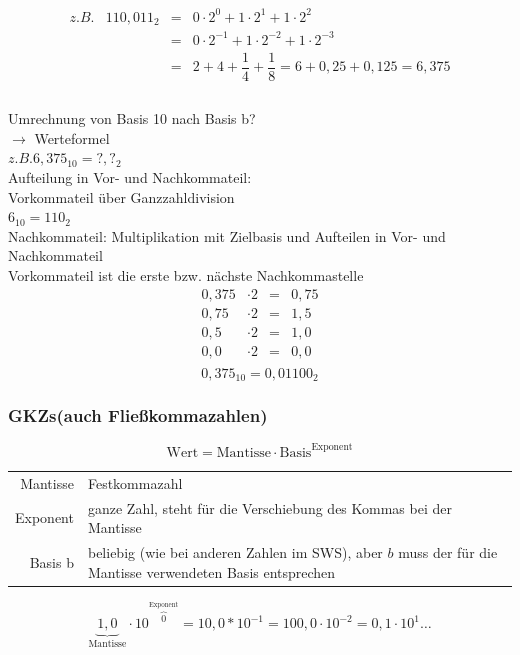 \documentclass[10pt,a4paper]{scrartcl}
\begin{document}
$$
\begin{array}{rrcl}
z.B. & 110,011_2 & = & 0 \cdot 2^0 + 1 \cdot 2^1 + 1 \cdot 2^2 \\
        &                     & = & 0 \cdot 2^{-1} + 1 \cdot 2^{-2} + 1 \cdot 2^{-3} \\
        &                     & = & 2 + 4 + \dfrac{1}{4} + \dfrac{1}{8} = 6 + 0,25 + 0,125 = 6,375 \\
\end{array}
$$
\\
Umrechnung von Basis 10 nach Basis b? \\
$\rightarrow$ Werteformel\\
$ z.B. 6,375_{10} = ?,?_2 $\\
\noindent
Aufteilung in Vor- und Nachkommateil: \\
Vorkommateil über Ganzzahldivision\\
$ 6_{10} = 110_{2} $\\
Nachkommateil: Multiplikation mit Zielbasis und Aufteilen in Vor- und Nachkommateil \\
Vorkommateil ist die erste bzw. nächste Nachkommastelle
$$
\begin{array}{rlcl}
0,375 & \cdot 2 & = & 0,75\\
0,75   & \cdot 2 & = & 1,5\\
0,5     & \cdot 2 & = & 1,0\\
0,0     & \cdot 2 & = & 0,0\\
\end{array}
$$
$$
0,375_{10} = 0,01100_{2}
$$

\subsubsection{\acp{GKZ}(auch Fließkommazahlen)}
$$
\text{Wert} = \text{Mantisse} \cdot \text{Basis}^{\text{Exponent}}
$$
\begin{tabular}{rl}
	Mantisse  & Festkommazahl \\
	Exponent & ganze Zahl, steht für die Verschiebung des Kommas bei der Mantisse\\
	Basis b     & beliebig (wie bei anderen Zahlen im \ac{SWS}), aber $b$ muss der für die Mantisse verwendeten Basis entsprechen\\
\end{tabular}

$$
\underbrace{1,0}_{\text{Mantisse}} \cdot 10^{\overbrace{0}^{\text{Exponent}}} = 10,0 * 10^{-1} = 100,0 \cdot 10^{-2} = 0,1 \cdot 10^{1} \ldots
$$
\end{document}
